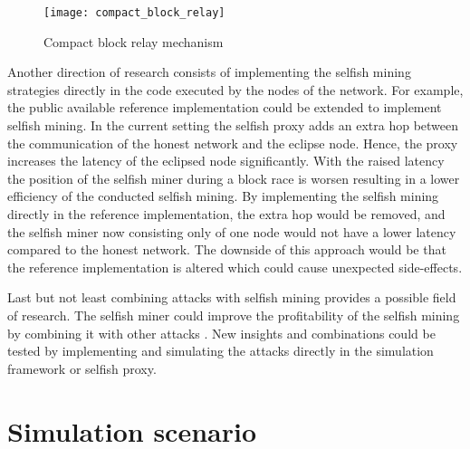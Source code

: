 \begin{figure}[t]
\texttt{[image: compact\_block\_relay]}
\centering
\caption{Compact block relay mechanism \cite{bip152}}
\label{fig:compact_block_relay}
\end{figure}

Another direction of research consists of implementing the selfish mining strategies directly in the code executed by the nodes of the network.
For example, the public available reference implementation could be extended to implement selfish mining.
In the current setting the selfish proxy adds an extra hop between the communication of the honest network and the eclipse node.
Hence, the proxy increases the latency of the eclipsed node significantly.
With the raised latency the position of the selfish miner during a block race is worsen resulting in a lower efficiency of the conducted selfish mining.
By implementing the selfish mining directly in the reference implementation, the extra hop would be removed, and the selfish miner now consisting only of one node would not have a lower latency compared to the honest network.
The downside of this approach would be that the reference implementation is altered which could cause unexpected side-effects.

Last but not least combining attacks with selfish mining provides a possible field of research.
The selfish miner could improve the profitability of the selfish mining by combining it with other attacks \cite{gervais2016security, sapirshtein2016optimal, nayak2016stubborn, gervais2015tampering}.
New insights and combinations could be tested by implementing and simulating the attacks directly in the simulation framework or selfish proxy.

\section{Simulation scenario}

